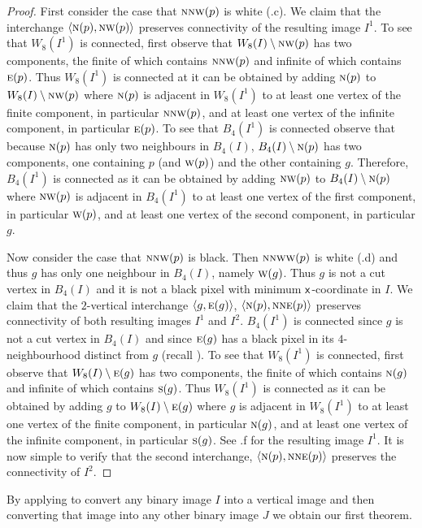 \documentclass[lotsofwhite,charterfonts]{patmorin}
\newcommand{\N}{\textsc{n}}
\newcommand{\NE}{\textsc{ne}}
\newcommand{\E}{\textsc{e}}
\renewcommand{\S}{\textsc{s}}
\newcommand{\W}{\textsc{w}}
\newcommand{\NW}{\textsc{nw}}
\newcommand{\x}{\ensuremath{\protect\textup{\textsf{x}}}}
\newcommand{\ic}[2]{\langle #1,#2 \rangle}
\newcommand{\sm}{\ensuremath{\setminus}}
\begin{document}
\begin{proof}
First consider the case that $\N\NW(p)$ is white (.c). We claim that the interchange $\ic{\N(p)}{\NW(p)}$ preserves connectivity of the resulting image $I^1$. To see that $W_8(I^1)$ is connected, first observe that $W_8(I)\sm \NW(p)$ has two components, the finite of which contains $\N\NW(p)$ and infinite of which contains $\E(p)$. Thus $W_8(I^1)$ is connected at it can be obtained by adding $\N(p)$ to $W_8(I)\sm \NW(p)$ where $\N(p)$ is adjacent in $W_8(I^1)$ to at least one vertex of the finite component, in particular $\N\NW(p)$, and at least one vertex of the infinite component, in particular $\E(p)$. To see that $B_4(I^1)$ is connected observe that because $\N(p)$ has only two neighbours in $B_4(I)$, $B_4(I)\sm \N(p)$ has two components, one containing $p$ (and $\W(p)$) and the other containing $g$. Therefore, $B_4(I^1)$ is connected as it can be obtained by adding $\NW(p)$ to $B_4(I)\sm \N(p)$ where $\NW(p)$ is adjacent in $B_4(I^1)$ to at least one vertex of the first component, in particular $\W(p)$, and at least one vertex of the second component, in particular $g$.

Now consider the case that $\N\NW(p)$ is black. Then $\N\NW\W(p)$ is white (.d) and thus $g$ has only one neighbour in $B_4(I)$, namely $\W(g)$. Thus $g$ is not a cut vertex in $B_4(I)$ and it is not a black pixel with minimum \x-coordinate in $I$. We claim that the $2$-vertical interchange $\ic{g}{\E(g)}$, $\ic{\N(p)}{\N\NE(p)}$ preserves connectivity of both resulting images $I^1$ and $I^2$. $B_4(I^1)$ is connected since $g$ is not a cut vertex in $B_4(I)$ and since $\E(g)$ has a black pixel in its $4$-neighbourhood distinct from $g$ (recall ). To see that $W_8(I^1)$ is connected, first observe that $W_8(I)\sm \E(g)$  has two components, the finite of which contains $\N(g)$ and infinite of which contains $\S(g)$. Thus $W_8(I^1)$ is connected as it can be obtained by adding $g$ to $W_8(I)\sm \E(g)$  where $g$ is adjacent in $W_8(I^1)$ to at least one vertex of the finite component, in particular $\N(g)$, and at least one vertex of the infinite component, in particular $\S(g)$. See .f for the resulting image $I^1$. It is now simple to verify that the second interchange, $\ic{\N(p)}{\N\NE(p)}$ preserves the connectivity of $I^2$.
\end{proof}

By applying  to convert any binary image $I$ into a
vertical image and then converting that image  into any
other binary image $J$ we obtain our first theorem.
\end{document}
